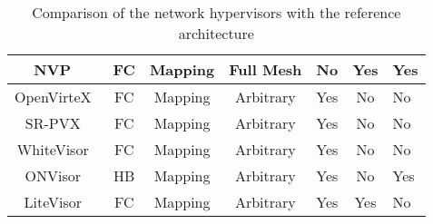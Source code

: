 \begin{table}[]
{\begin{tabular}{|c|c|c|c|c|c|l|}
NVP~\cite{NVP-Koponen2014}                                      & FC                  & Mapping       & Full Mesh     & No  & Yes & Yes      \\ \hline
OpenVirteX~\cite{OpenVirteX-Al-Shabibi2014}                     & FC                  & Mapping       & Arbitrary     & Yes & No  & No       \\ \hline
SR-PVX~\cite{PVX-Li2017}                                        & FC                       & Mapping       & Arbitrary     & Yes & No  & No       \\ \hline
WhiteVisor~\cite{whitevisor-Yu2019}                             & FC                 & Mapping       & Arbitrary     & Yes & No  & No       \\ \hline
ONVisor~\cite{ONVisor-Han2018}                                  & HB                       & Mapping       & Arbitrary     & Yes & No  & Yes      \\ \hline
LiteVisor~\cite{Litevisor-Yang2018}                             & FC                  & Mapping       & Arbitrary     & Yes & Yes & No       \\ \hline
\end{tabular}%
}
\caption{Comparison of the network hypervisors with the reference architecture}
\label{tab:comparison-refarchi}
\end{table}